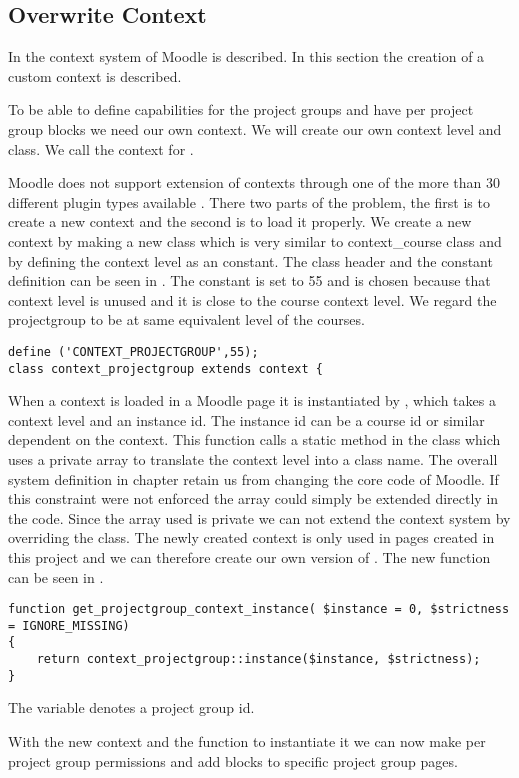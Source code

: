 
\subsection{Overwrite Context}
In   the context system of Moodle is described. In this section the creation of a custom context is described. 

To be able to define capabilities for the project groups and have per project group blocks we need our own context. We will create our own context level and class.
We call the context for . 

Moodle does not support extension of contexts through one of the more than 30 different plugin types available \cite{moodleplugins}. 
There two parts of the problem, the first is to create a new context and the second is to load it properly. 
We create a new context by making a new class which is very similar to context\_course class and by defining the context level as an constant. 
The class header and the constant definition can be seen in . 
The constant is set to 55 and is chosen because that context level is unused and it is close to the course context level. 
We regard the projectgroup to be at same equivalent level of the courses. 

\begin{lstlisting}[style=phpCode, caption=\myCaption{The context\_projectgroup class header and constant definition}, label=codeprojectgroupcontext]
define ('CONTEXT_PROJECTGROUP',55);
class context_projectgroup extends context {
\end{lstlisting}

When a context is loaded in a Moodle page it is instantiated by , which takes a context level and an instance id. 
The instance id can be a course id or similar dependent on the context. 
This function calls a static method in the  class which uses a private array to translate the context level into a class name.
The overall system definition in chapter \label{sec:systemDef} retain us from changing the core code of Moodle. 
If this constraint were not enforced the array could simply be extended directly in the code.  
Since the array used is private we can not extend the context system by overriding the  class. 
The newly created context is only used in pages created in this project and we can therefore create our own version of . 
The new function can be seen in .
\begin{lstlisting}[style=phpCode, caption=\myCaption{The function to get projectgroup context}, label=codeprojectgroupcontextinstance]
function get_projectgroup_context_instance( $instance = 0, $strictness = IGNORE_MISSING) 
{ 
    return context_projectgroup::instance($instance, $strictness);
}
\end{lstlisting}
The  variable denotes a project group id. 

With the new context and the function to instantiate it we can now make per project group permissions and add blocks to specific project group pages. 